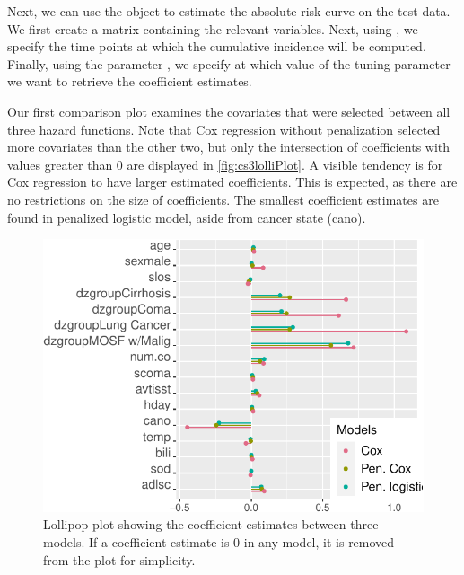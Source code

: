 \documentclass[
]{jss}
\begin{document}
Next, we can use the object  to estimate the absolute risk
curve on the test data. We first create a matrix  containing
the relevant variables. Next, using , we specify the time
points at which the cumulative incidence will be computed. Finally,
using the parameter , we specify at which value
of the tuning parameter we want to retrieve the coefficient estimates.

\begin{CodeChunk}

\end{CodeChunk}

Our first comparison plot examines the covariates that were selected
between all three hazard functions. Note that Cox regression without
penalization selected more covariates than the other two, but only the
intersection of coefficients with values greater than 0 are displayed in
\ref{fig:cs3lolliPlot}. A visible tendency is for Cox regression to have
larger estimated coefficients. This is expected, as there are no
restrictions on the size of coefficients. The smallest coefficient
estimates are found in penalized logistic model, aside from cancer state
(cano).

\begin{CodeChunk}
\begin{figure}

{\centering \includegraphics{../figures/coefplots-1} 

}

\caption{\label{fig:cs3lolliPlot} Lollipop plot showing the coefficient estimates between three models. If a coefficient estimate is 0 in any model, it is removed from the plot for simplicity.}\label{fig:coefplots}
\end{figure}
\end{CodeChunk}
\end{document}
